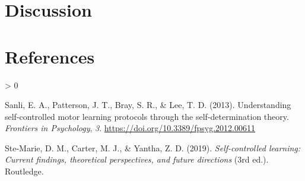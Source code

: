 \documentclass[
  english,
  jou]{apa7}
\newlength{\cslhangindent}
\newenvironment{CSLReferences}[2] %
 {%
  \setlength{\parindent}{0pt}
  \ifodd #1 \everypar{\setlength{\hangindent}{\cslhangindent}}\ignorespaces\fi
  \ifnum #2 > 0
  \setlength{\parskip}{#2\baselineskip}
  \fi
 }%
 {}
\begin{document}
\hypertarget{discussion}{%
\section{Discussion}\label{discussion}}

\newpage

\hypertarget{references}{%
\section{References}\label{references}}

\begingroup
\setlength{\parindent}{-0.5in}
\setlength{\leftskip}{0.5in}

\hypertarget{refs}{}
\begin{CSLReferences}{1}{0}
\leavevmode\hypertarget{ref-sanli2013}{}%
Sanli, E. A., Patterson, J. T., Bray, S. R., \& Lee, T. D. (2013). Understanding self-controlled motor learning protocols through the self-determination theory. \emph{Frontiers in Psychology}, \emph{3}. \url{https://doi.org/10.3389/fpsyg.2012.00611}

\leavevmode\hypertarget{ref-ste-marie2019}{}%
Ste-Marie, D. M., Carter, M. J., \& Yantha, Z. D. (2019). \emph{Self-controlled learning: Current findings, theoretical perspectives, and future directions} (3rd ed.). Routledge.

\end{CSLReferences}

\endgroup
\end{document}
